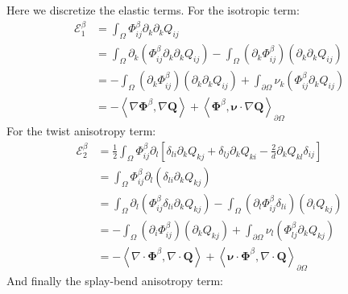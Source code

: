 \documentclass[reqno]{article}
\newcommand{\Q}{\mathbf{Q}}
\begin{document}
Here we discretize the elastic terms.
For the isotropic term:
\begin{equation}
\begin{split}
    \mathcal E^\beta_1
    &=
    \int_\Omega \Phi^\beta_{ij} \partial_k \partial_k Q_{ij}  \\
    &=
    \int_\Omega \partial_k \left( \Phi^\beta_{ij} \partial_k \partial_k Q_{ij} \right)
    - \int_\Omega \left( \partial_k \Phi^\beta_{ij} \right) \left( \partial_k \partial_k Q_{ij} \right) \\
    &=
    - \int_\Omega \left( \partial_k \Phi^\beta_{ij} \right) \left( \partial_k \partial_k Q_{ij} \right)
    + \int_{\partial \Omega} \nu_k \left( \Phi^\beta_{ij} \partial_k Q_{ij} \right) \\
    &=
    -\left< \nabla \boldsymbol \Phi^\beta, \nabla \Q \right>
    + \left< \boldsymbol \Phi^\beta, \boldsymbol \nu \cdot \nabla \Q \right>_{\partial \Omega}
\end{split}
\end{equation}
For the twist anisotropy term:
\begin{equation}
\begin{split}
    \mathcal E^\beta_2
    &=
    \frac{1}{2} \int_\Omega \Phi^\beta_{ij} \partial_l \left[
        \delta_{li} \partial_k Q_{kj}
        + \delta_{lj} \partial_k Q_{ki}
        - \frac{2}{d} \partial_k Q_{kl} \delta_{ij}
    \right] \\
    &=
    \int_\Omega \Phi^\beta_{ij} \partial_l \left( \delta_{li} \partial_k Q_{kj} \right) \\
    &=
    \int_\Omega \partial_l \left( \Phi^\beta_{ij} \delta_{li} \partial_k Q_{kj} \right)
    - \int_\Omega \left(\partial_l \Phi^\beta_{ij} \delta_{li} \right) \left( \partial_i Q_{kj} \right) \\
    &=
    - \int_\Omega \left(\partial_i \Phi^\beta_{ij} \right) \left( \partial_k Q_{kj} \right) 
    + \int_{\partial \Omega} \nu_l \left( \Phi^\beta_{lj} \partial_k Q_{kj} \right) \\
    &=
    - \left< \nabla \cdot \boldsymbol \Phi^\beta, \nabla \cdot \Q \right>
    + \left< \boldsymbol \nu \cdot \boldsymbol \Phi^\beta, \nabla \cdot \Q \right>_{\partial \Omega} 
\end{split}
\end{equation}
And finally the splay-bend anisotropy term:
\end{document}
